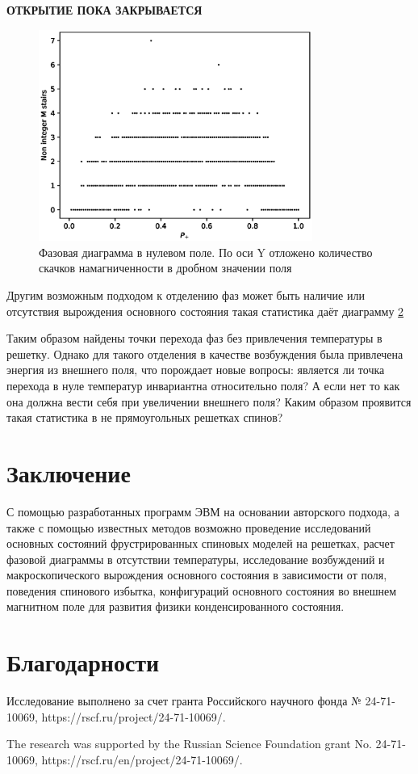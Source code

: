 \documentclass[utf8, babel, sor, jor, amsmath, amssymb, reprint]{elsarticle} %
\begin{document}
\textbf{ОТКРЫТИЕ ПОКА ЗАКРЫВАЕТСЯ}

\begin{figure}[H]
	\centering
	\includegraphics[width=0.8\textwidth]{images/Fractional_stairs.eps}
	\caption{Фазовая диаграмма в нулевом поле. По оси Y отложено количество скачков намагниченности в дробном значении поля}
	\label{fig:fractional_stairs}
\end{figure}

Другим возможным подходом к отделению фаз может быть наличие или отсутствия вырождения основного состояния такая статистика даёт диаграмму \ref{}

Таким образом найдены точки перехода фаз без привлечения температуры в решетку. Однако для такого отделения в качестве возбуждения была привлечена энергия из внешнего поля, что порождает новые вопросы: является ли точка перехода в нуле температур инвариантна относительно поля? А если нет то как она должна вести себя при увеличении внешнего поля? Каким образом проявится такая статистика в не прямоугольных решетках спинов?

\section{Заключение}

С помощью разработанных программ ЭВМ на основании авторского подхода, а также с помощью известных методов возможно проведение исследований основных состояний фрустрированных спиновых моделей на решетках, расчет фазовой диаграммы в отсутствии температуры, исследование возбуждений и макроскопического вырождения основного состояния в зависимости от поля, поведения спинового избытка, конфигураций основного состояния во внешнем магнитном поле для развития физики конденсированного состояния.


\section{Благодарности}

Исследование выполнено за счет гранта Российского научного фонда № 24-71-10069, https://rscf.ru/project/24-71-10069/.

The research was supported by the Russian Science Foundation grant No. 24-71-10069, https://rscf.ru/en/project/24-71-10069/.


\end{document}
